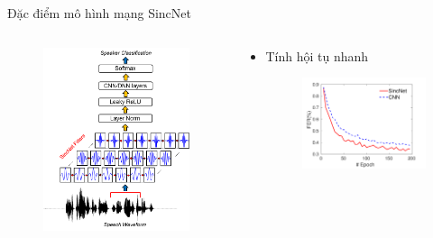 \documentclass[notheorems, aspectratio=54]{beamer}
\begin{document}
\begin{frame}{Đặc điểm mô hình mạng SincNet}
	\begin{columns}
		\begin{column}{0.47\textwidth}
			\begin{figure}[H]
				\includegraphics[width=1\linewidth]{images/SincNet.png}
			\end{figure}
		\end{column}
		\begin{column}{0.5\textwidth}
		\begin{itemize}
			\item Tính hội tụ nhanh
			\begin{figure}[H]
				\includegraphics[width=0.9\linewidth]{images/fast_convergence.png}

\end{figure}
\end{itemize}
\end{column}
\end{columns}
\end{frame}
\end{document}
